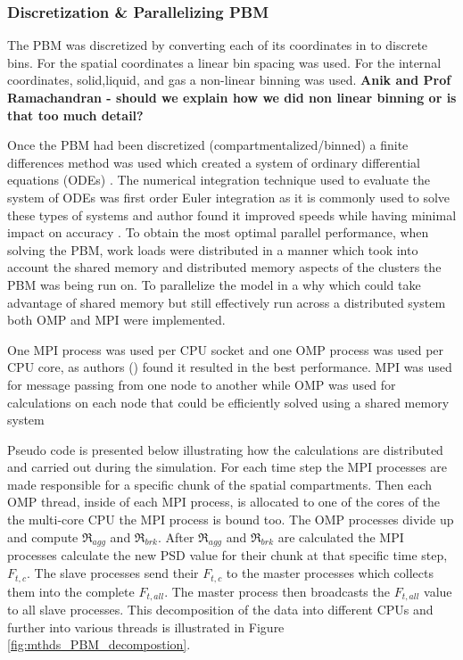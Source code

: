 \documentclass[preprint,11pt,authoryear]{elsarticle}
\begin{document}
\subsubsection{Discretization \& Parallelizing PBM}
\par The PBM was discretized by converting each of its coordinates in to discrete bins. For the spatial 
coordinates a linear bin spacing was used. For the internal coordinates, solid,liquid, and gas a 
non-linear binning was used. \textbf{Anik and Prof Ramachandran - should we explain how we did 
    non linear binning or is that too much detail?}
\par Once the PBM had been discretized (compartmentalized/binned) a finite differences method was 
used which created a system of ordinary differential equations (ODEs) \citep{Barrasso2015cerd}. The 
numerical integration technique used to evaluate the system of ODEs was first order Euler integration 
as it is commonly used to solve these types of systems and author  found it improved speeds while 
having minimal impact on accuracy \citep{Barrasso2013}. To obtain the most optimal parallel 
performance, when solving the PBM, work loads were distributed in a manner which took into account 
the shared memory and distributed memory aspects of the clusters the PBM was being run on. To 
parallelize the model in a why which could take advantage of shared memory but still effectively run 
across a distributed system both OMP and MPI were implemented. 
\par One MPI process was used per CPU socket and one OMP process was used per CPU core, as 
authors (\cite{Bettencourt2017}) found it resulted in the best performance. MPI was used for message 
passing from one node to another while OMP was used for calculations on each node that could be 
efficiently solved using a shared memory system  
\par Pseudo code is presented below illustrating how the calculations are distributed and carried out 
during the simulation. For each time step the MPI processes are made responsible for a specific chunk 
of the spatial compartments. Then each OMP thread, inside of each MPI process, is allocated to one of 
the cores of the the multi-core CPU the MPI process is bound too. The OMP processes divide up and 
compute $\Re_{agg}$ and $\Re_{brk}$. After $\Re_{agg}$ and $\Re_{brk}$ are calculated the MPI 
processes calculate the new PSD value for their chunk at that specific time step, $F_{t,c}$. The slave 
processes send their $F_{t,c}$ to the master processes which collects them into the complete 
$F_{t,all}$. The master process then broadcasts the $F_{t,all}$ value to all slave processes. This 
decomposition of the data into different CPUs and further into various threads is illustrated in Figure 
\ref{fig:mthds_PBM_decompostion}.	
\end{document}
